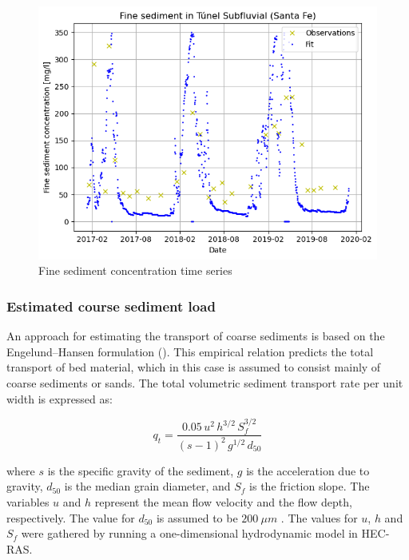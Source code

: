 \begin{figure}[H]
    \centering
    \includegraphics[width=0.5\linewidth]{figures/ch6/fine sediment concentrations.png}
    \caption{Fine sediment concentration time series}
    \label{fig:timeseries fine sediments}
\end{figure}



\subsubsection{Estimated course sediment load}
An approach for estimating the transport of coarse sediments is based on the Engelund–Hansen formulation (\cite{engelundMonographSedimentTransport1967}). This empirical relation predicts the total transport of bed material, which in this case is assumed to consist mainly of coarse sediments or sands. The total volumetric sediment transport rate per unit width is expressed as:

\begin{equation}
    q_{t} = \frac{0.05\,u^{2}\,h^{3/2}\,S_{f}^{3/2}}{(s - 1)^{2}\,g^{1/2}\,d_{50}}
    \label{eq:engelund_hansen}
\end{equation}

where \( s \) is the specific gravity of the sediment, \( g \) is the acceleration due to gravity, \( d_{50} \) is the median grain diameter, and \( S_{f} \) is the friction slope. The variables \( u \) and \( h \) represent the mean flow velocity and the flow depth, respectively. The value for $d_{50}$ is assumed to be $200 ~\mu m$ \autocite{reMetodologiaParaGeneracion2009}. The values for $u$, $h$ and $S_f$ were gathered by running a one-dimensional hydrodynamic model in HEC-RAS. 






